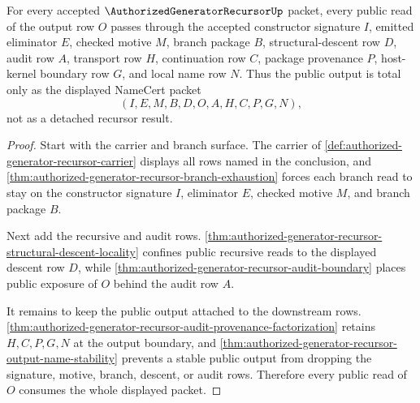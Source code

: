 \begin{theorem}
\label{thm:authorized-generator-recursor-root-output-audit-totality}
For every accepted $\AuthorizedGeneratorRecursorUp$ packet, every public read
of the output row $O$ passes through the accepted constructor signature $I$,
emitted eliminator $E$, checked motive $M$, branch package $B$,
structural-descent row $D$, audit row $A$, transport row $H$, continuation
row $C$, package provenance $P$, host-kernel boundary row $G$, and local name
row $N$. Thus the public output is total only as the displayed NameCert packet
$$
(I,E,M,B,D,O,A,H,C,P,G,N),
$$
not as a detached recursor result.
\end{theorem}
\begin{proof}
Start with the carrier and branch surface. The carrier of
\autoref{def:authorized-generator-recursor-carrier} displays all rows named in
the conclusion, and
\autoref{thm:authorized-generator-recursor-branch-exhaustion} forces each
branch read to stay on the constructor signature $I$, eliminator $E$, checked
motive $M$, and branch package $B$.

Next add the recursive and audit rows.
\autoref{thm:authorized-generator-recursor-structural-descent-locality}
confines public recursive reads to the displayed descent row $D$, while
\autoref{thm:authorized-generator-recursor-audit-boundary} places public
exposure of $O$ behind the audit row $A$.

It remains to keep the public output attached to the downstream rows.
\autoref{thm:authorized-generator-recursor-audit-provenance-factorization}
retains $H,C,P,G,N$ at the output boundary, and
\autoref{thm:authorized-generator-recursor-output-name-stability} prevents a
stable public output from dropping the signature, motive, branch, descent, or
audit rows. Therefore every public read of $O$ consumes the whole displayed
packet.
\end{proof}

